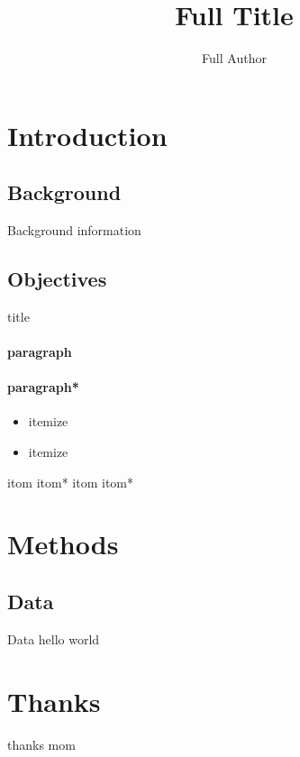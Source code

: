 \documentclass[
  color=002244,
  logo=fig/logo,
]{slides}
\title[Short Title]{Full Title}
\author[Short Author]{Full Author}
\institute{Institute}
\begin{document}
  \maketitle
  \section{Introduction}
  \subsection{Background}
  \begin{frame}{Background}
    information
  \end{frame}
  \subsection{Objectives}
  \begin{frame}{title}
    \paragraph{paragraph}
    \paragraph*{paragraph*}
    \begin{itemize}
      \item itemize
      \item itemize
    \end{itemize}
    \itom itom
    \itom* itom*
    \itom itom
    \itom* itom*
  \end{frame}
  \section{Methods}
  \subsection{Data}
  \begin{frame}{Data}
    hello world
  \end{frame}
  \section[]{Thanks}
  \begin{frame}{thanks}
    mom
  \end{frame}
\end{document}
